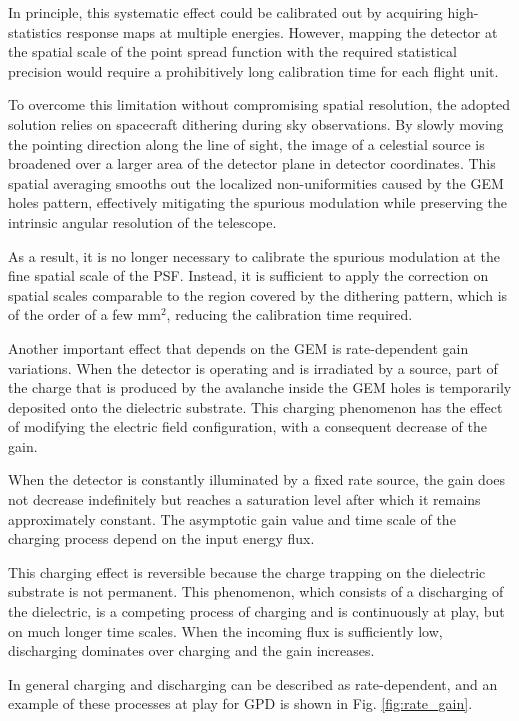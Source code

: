 In principle, this systematic effect could be calibrated out by acquiring high-statistics response maps at multiple energies. However, mapping the detector at the spatial scale of the point spread function with the required statistical precision would require a prohibitively long calibration time for each flight unit.

To overcome this limitation without compromising spatial resolution, the adopted solution relies on spacecraft dithering during sky observations. By slowly moving the pointing direction along the line of sight, the image of a celestial source is broadened over a larger area of the detector plane in detector coordinates. This spatial averaging smooths out the localized non-uniformities caused by the GEM holes pattern, effectively mitigating the spurious modulation while preserving the intrinsic angular resolution of the telescope.

As a result, it is no longer necessary to calibrate the spurious modulation at the fine spatial scale of the PSF. Instead, it is sufficient to apply the correction on spatial scales comparable to the region covered by the dithering pattern, which is of the order of a few mm$^2$, reducing the calibration time required.

Another important effect that depends on the GEM is rate-dependent gain variations. When the detector is operating and is irradiated by a source, part of the charge that is produced by the avalanche inside the GEM holes is temporarily deposited onto the dielectric substrate. This charging phenomenon has the effect of modifying the electric field configuration, with a consequent decrease of the gain.

When the detector is constantly illuminated by a fixed rate source, the gain does not decrease indefinitely but reaches a saturation level after which it remains approximately constant. The asymptotic gain value and time scale of the charging process depend on the input energy flux.

This charging effect is reversible because the charge trapping on the dielectric substrate is not permanent. This phenomenon, which consists of a discharging of the dielectric, is a competing process of charging and is continuously at play, but on much longer time scales. When the incoming flux is sufficiently low, discharging dominates over charging and the gain increases.

In general charging and discharging can be described as rate-dependent, and an example of these processes at play for GPD is shown in Fig. \ref{fig:rate_gain}.

